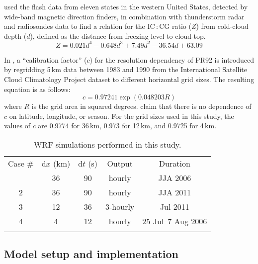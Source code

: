 \citet{Price:1993fk} used the flash data from eleven states in the western
United States, detected by wide-band magnetic direction finders, in
combination with thunderstorm radar and radiosondes data to find a relation
for the IC\,:\,CG ratio ($Z$) from cold-cloud depth ($d$), defined as the
distance from freezing level to cloud-top.
\begin{equation}\label{eq:Z}
Z = 0.021d^4-0.648d^3+7.49d^2-36.54d + 63.09
\end{equation}

In \citet{Price:1994fk}, a ``calibration factor'' ($c$) for the resolution
dependency of PR92 is introduced by regridding 5\,\unit{km} data between 1983
and 1990 from the International Satellite Cloud Climatology Project dataset
\citep[ISCCP;][]{Rossow:1991aa} to different horizontal grid sizes. The
resulting equation is as follows:
      \begin{equation}\label{eq:calib}
            c = 0.97241\exp(0.048203R)
      \end{equation}
where $R$ is the grid area in squared degrees. \citet{Price:1994fk} claim
that there is no dependence of $c$ on latitude, longitude, or season. For the
grid sizes used in this study, the values of $c$ are 0.9774 for
36\,\unit{km}, 0.973 for 12\,\unit{km}, and 0.9725 for 4\,\unit{km}.


\begin{table}[t]
\caption{WRF simulations performed in this study.}
\begin{tabular}{ccccc} \tophline
Case \# & d$x$ (km) & d$t$ (\unit{s}) & Output &
Duration \\
\middlehline
1 & 36 & 90 & hourly & JJA 2006 \\
2 & 36 & 90 & hourly & JJA 2011 \\
3 & 12 & 36 & 3-hourly &Jul 2011 \\
4 & 4 & 12 & hourly &25 Jul--7 Aug 2006 \\
\bottomhline
\end{tabular}
\label{tab:setup}
\end{table}

\subsection{Model setup and implementation}\label{ssec:model}

